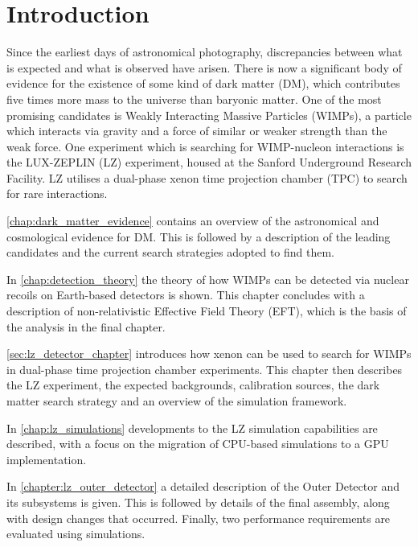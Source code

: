 \chapter{Introduction}
\par
Since the earliest days of astronomical photography, discrepancies between what is expected and what is observed have arisen.
There is now a significant body of evidence for the existence of some kind of dark matter (DM), which contributes five times more mass to the universe than baryonic matter.
One of the most promising candidates is Weakly Interacting Massive Particles (WIMPs), a particle which interacts via gravity and a force of similar or weaker strength than the weak force.
One experiment which is searching for WIMP-nucleon interactions is the LUX-ZEPLIN (LZ) experiment, housed at the Sanford Underground Research Facility.
LZ utilises a dual-phase xenon time projection chamber (TPC) to search for rare interactions.

\par
\autoref{chap:dark_matter_evidence} contains an overview of the astronomical and cosmological evidence for DM.
This is followed by a description of the leading candidates and the current search strategies adopted to find them.

\par
In \autoref{chap:detection_theory} the theory of how WIMPs can be detected via nuclear recoils on Earth-based detectors is shown.
This chapter concludes with a description of non-relativistic Effective Field Theory (EFT), which is the basis of the analysis in the final chapter.

\par
\autoref{sec:lz_detector_chapter} introduces how xenon can be used to search for WIMPs in dual-phase time projection chamber experiments.
This chapter then describes the LZ experiment, the expected backgrounds, calibration sources, the dark matter search strategy and an overview of the simulation framework.

\par
In \autoref{chap:lz_simulations} developments to the LZ simulation capabilities are described, with a focus on the migration of CPU-based simulations to a GPU implementation.

\par
In \autoref{chapter:lz_outer_detector} a detailed description of the Outer Detector and its subsystems is given.
This is followed by details of the final assembly, along with design changes that occurred.
Finally, two performance requirements are evaluated using simulations.

